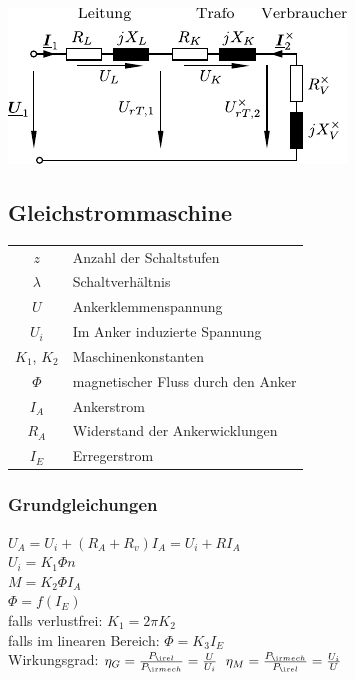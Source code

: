 \documentclass[european]{latex4ei_sheet}
\begin{document}
		
		\includegraphics{./img/LeitungTrafo.pdf}
	
		\subsection{Gleichstrommaschine}
		
		\begin{tabular}{cl}
		$z$ & Anzahl der Schaltstufen \\
		$\lambda$ & Schaltverhältnis \\
		$U$ & Ankerklemmenspannung \\
		$U_i$ & Im Anker induzierte Spannung \\
		$K_1$, $K_2$ & Maschinenkonstanten \\
		$\Phi$ & magnetischer Fluss durch den Anker \\
		$I_A$ & Ankerstrom \\
		$R_A$ & Widerstand der Ankerwicklungen \\
		$I_E$ & Erregerstrom
		\end{tabular}
		
		\subsubsection{Grundgleichungen}
		$U_A = U_i + (R_A + R_v) I_A = U_i + RI_A$\\
		$U_i = K_1 \Phi n$\\
		$M = K_2 \Phi I_A$\\
		$\Phi = f(I_E)$\\
		falls verlustfrei: $K_1 = 2 \pi K_2$ \\
		falls im linearen Bereich: $\Phi = K_3 I_E$ \\
		
		Wirkungsgrad: $\eta_G = \frac{P_{\ir el}}{P_{\ir mech}} = \frac{U}{U_i}$ \qquad $\eta_M = \frac{P_{\ir mech}}{P_{\ir el}} = \frac{U_i}{U}$
		
\end{document}
